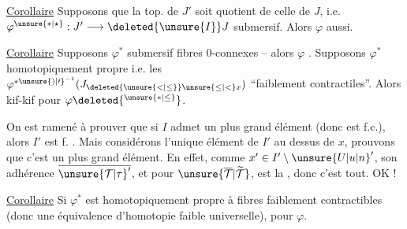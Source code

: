 \uline{Corollaire}  Supposons que la top. de $J'$ soit quotient de celle de $J$,  i.e. $\varphi^{\unsure{*|\star}}:J'\longrightarrow \deleted{\unsure{I}}J$ submersif. Alors $\varphi$ aussi.

\uline{Corollaire}  Supposons $\varphi^*$ submersif  fibres $0$-connexes -- alors $\varphi$ . Supposons $\varphi^*$  homotopiquement propre i.e. les $\varphi^{{*\unsure{)|\prime}}^{-1}}(J_{\deleted{\unsure{<|\leq}}\unsure{\leq|<}x})$ ``faiblement contractiles''.  Alors kif-kif pour $\varphi\deleted{^{\unsure{*|\leq}}}$.

On est ramené à prouver que si $I$ admet un plus grand élément  (donc est f.c.), alors $I'$ est f. . Mais considérons l'unique élément  de $I'$ au dessus de $x$, prouvons que c'est un plus grand élément. En effet, comme $x'\in I'\setminus{\unsure{U|u|n}}'$, son adhérence  $\overline{{\unsure{\mathcal{T}|\tau}}'}$, et pour $\unsure{\overline{\mathcal{T}}|\widetilde{\mathcal{T}}}$, est la \unsure{$=$}, donc c'est tout. OK !

\uline{Corollaire}  Si $\varphi^*$ est homotopiquement propre à fibres  faiblement contractibles (donc une équivalence d'homotopie faible universelle),  pour $\varphi$.

